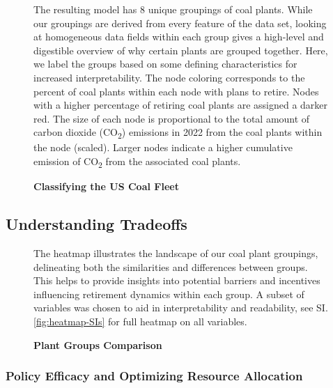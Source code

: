 \begin{figure}[H]
    
    \caption{\textbf{Classifying the US Coal Fleet}}
    \medskip
    \footnotesize
    The resulting model has 8 unique groupings of coal plants. While our groupings are derived from every feature of the data set, looking at homogeneous data fields within each group gives a high-level and digestible overview of why certain plants are grouped together. Here, we label the groups based on some defining characteristics for increased interpretability.
    The node coloring corresponds to the percent of coal plants within each node with plans to retire. Nodes with a higher percentage of retiring coal plants are assigned a darker red. The size of each node is proportional to the total amount of carbon dioxide (CO\textsubscript{2}) emissions in 2022 from the coal plants within the node (scaled). 
    Larger nodes indicate a higher cumulative emission of CO\textsubscript{2} from the associated coal plants.
    \label{fig:coal-fleet-partition}
\end{figure}



\subsection{Understanding Tradeoffs}

\begin{figure}[H]
      
    \caption{\textbf{Plant Groups Comparison}}
    \medskip
    \footnotesize
    The heatmap illustrates the landscape of our coal plant groupings, delineating both the similarities and differences between groups. This helps to provide insights into potential barriers and incentives influencing retirement dynamics within each group.
    A subset of variables was chosen to aid in interpretability and readability, see SI.\ref{fig:heatmap-SIs} for full heatmap on all variables.
    \label{fig:heatmap}
\end{figure}

\subsubsection{Policy Efficacy and Optimizing Resource Allocation}



